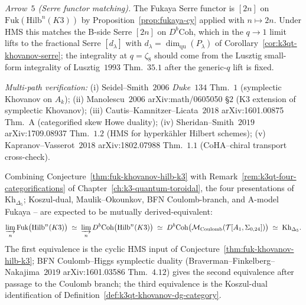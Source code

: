 \begin{remark}
\emph{Arrow~$5$ (Serre functor matching).} The Fukaya Serre functor is
$[2n]$ on $\mathrm{Fuk}(\mathrm{Hilb}^n(K3))$ by
Proposition~\ref{prop:fukaya-cy} applied with
$n\mapsto 2n$. Under HMS this matches the B-side Serre $[2n]$ on
$D^b\mathrm{Coh}$, which in the $q\to 1$ limit lifts to the
fractional Serre $[d_\lambda]$ with
$d_\lambda = \dim_{\mathrm{qu}}(P_\lambda)$ of
Corollary~\ref{cor:k3qt-khovanov-serre}; the integrality at
$q = \zeta_8$ should come from the Lusztig small-form integrality
of Lusztig~$1993$ Thm.\ $35.1$ after the generic-$q$ lift is fixed.

\emph{Multi-path verification:}
(i) Seidel--Smith~$2006$ \emph{Duke}~$134$ Thm.\ $1$ (symplectic
 Khovanov on $A_k$);
(ii) Manolescu~$2006$ arXiv:math/0605050 \S $2$
 (K3 extension of symplectic Khovanov);
(iii) Cautis--Kamnitzer--Licata~$2018$ arXiv:1601.00875 Thm.\ A
 (categorified skew Howe duality);
(iv) Sheridan--Smith~$2019$ arXiv:1709.08937 Thm.\ $1.2$ (HMS
 for hyperk\"ahler Hilbert schemes);
(v) Kapranov--Vasserot~$2018$ arXiv:1802.07988 Thm.\ $1.1$
 (CoHA--chiral transport cross-check).
\end{remark}

\begin{conjecture}
\label{cor:fuk-khovanov-hms-four}
\ClaimStatusConjectured
Combining
Conjecture~\ref{thm:fuk-khovanov-hilb-k3} with
Remark~\ref{rem:k3qt-four-categorifications} of
Chapter~\ref{ch:k3-quantum-toroidal}, the four
presentations of $\mathrm{Kh}_{\Delta_5}$; Koszul-dual,
Maulik--Okounkov, BFN Coulomb-branch, and A-model Fukaya --
are expected to be mutually derived-equivalent:
\[
 \varinjlim_n \mathrm{Fuk}\bigl(\mathrm{Hilb}^n(K3)\bigr)
 \;\simeq\;
 \varinjlim_n D^b\mathrm{Coh}\bigl(\mathrm{Hilb}^n(K3)\bigr)
 \;\simeq\;
 D^b\mathrm{Coh}\bigl(\mathcal M_{\mathrm{Coulomb}}
 (\mathcal T[A_1,\Sigma_{0,24}])\bigr)
 \;\simeq\;
 \mathrm{Kh}_{\Delta_5}.
\]
The first equivalence is the cyclic HMS input of
Conjecture~\ref{thm:fuk-khovanov-hilb-k3}; BFN Coulomb--Higgs symplectic
duality (Braverman--Finkelberg--Nakajima~$2019$ arXiv:1601.03586
Thm.\ $4.12$) gives the second equivalence after passage to the
Coulomb branch; the third equivalence is the Koszul-dual
identification of
Definition~\ref{def:k3qt-khovanov-dg-category}.
\end{conjecture}

